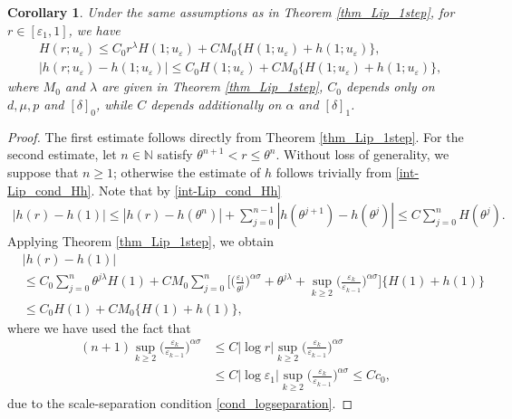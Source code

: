 \documentclass[reqno,12pt]{amsart} %
\newtheorem{corollary}[theorem]{Corollary}
\theoremstyle{definition}
\theoremstyle{remark}
\numberwithin{equation}{section}
\begin{document}
\begin{corollary}\label{int_coro_firststep}
    Under the same  assumptions as in  Theorem \ref{thm_Lip_1step},  for $r\in [\varepsilon_1, 1]$, we have
  \begin{align*}
    & H(r; u_\varepsilon)\leq C_0 r^\lambda H(1; u_\varepsilon)+CM_0\{H(1; u_\varepsilon)+h(1; u_\varepsilon)\},\\
    & |h(r; u_\varepsilon)-h(1; u_\varepsilon)|\leq C_0H(1; u_\varepsilon)+CM_0\{H(1; u_\varepsilon)+h(1; u_\varepsilon)\},
  \end{align*}
  where $M_0 $ and $\lambda$ are given in Theorem \ref{thm_Lip_1step}, $C_0$ depends only on $d, \mu, p $ and $[\delta]_0$, while $C$ depends additionally on $\alpha$ and $[\delta]_1$. 
\end{corollary}
\begin{proof}
    The first estimate follows directly from Theorem \ref{thm_Lip_1step}. For the second estimate, let $n\in\mathbb{N}$ satisfy $\theta^{n+1}< r\leq \theta^n$. Without loss of generality, we suppose that $n\geq 1$; otherwise the estimate of $h$ follows trivially from \eqref{int-Lip_cond_Hh}. Note that by \eqref{int-Lip_cond_Hh}
    \begin{align*}
        |h(r)-h(1)|\leq |h(r)-h(\theta^n)|+\sum_{j=0}^{n-1}|h(\theta^{j+1})-h(\theta^j)|\leq C\sum_{j=0}^n H(\theta^j). 
    \end{align*}
    Applying Theorem \ref{thm_Lip_1step}, we obtain
    \begin{align*}
        & |h(r)-h(1)|\\
        & \leq C_0\sum_{j=0}^{n}\theta^{j\lambda} H(1)+CM_0\sum_{j=0}^{n}\bigg[\Big(\frac{\varepsilon_{1}}{\theta^j}\Big)^{\alpha\sigma}+\theta^{j\lambda}+\sup_{k\geq 2}\bigg(\frac{\varepsilon_k}{\varepsilon_{k-1}}\bigg)^{\alpha\sigma}\bigg]\{H(1)+h(1)\}\\&\leq C_0H(1)+CM_0\{H(1)+h(1)\},
    \end{align*}
    where we have used the fact that
    \begin{align*}
        (n+1)\sup_{k\geq 2}\bigg(\frac{\varepsilon_k}{\varepsilon_{k-1}}\bigg)^{\alpha\sigma}&\leq C|\log r|\sup_{k\geq 2}\bigg(\frac{\varepsilon_k}{\varepsilon_{k-1}}\bigg)^{\alpha\sigma}\\&\leq C|\log \varepsilon_1|\sup_{k\geq 2}\bigg(\frac{\varepsilon_k}{\varepsilon_{k-1}}\bigg)^{\alpha\sigma}\leq Cc_0,
    \end{align*}
    due to the scale-separation condition \eqref{cond_logseparation}.  
    \end{proof}
\end{document}
